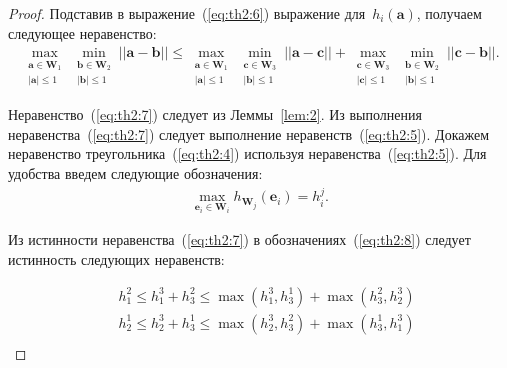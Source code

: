 \documentclass[12pt, twoside]{article}
\numberwithin{equation}{section}
\begin{document}
\begin{proof}
Подставив в выражение~(\ref{eq:th2:6}) выражение для~$h_i\left(\textbf{a}\right)$, получаем следующее неравенство:
\begin{equation}
\label{eq:th2:7}
\begin{aligned}
\max_{\substack{\textbf{a} \in \textbf{W}_1 \\ \left|\textbf{a}\right| \leq 1}} \min_{\substack{\textbf{b} \in \textbf{W}_2 \\ \left|\textbf{b}\right| \leq 1}}||\textbf{a} - \textbf{b}|| \leq 
\max_{\substack{\textbf{a} \in \textbf{W}_1 \\ \left|\textbf{a}\right| \leq 1}} \min_{\substack{\textbf{c} \in \textbf{W}_3 \\ \left|\textbf{b}\right| \leq 1}}||\textbf{a} - \textbf{c}||+
\max_{\substack{\textbf{c} \in \textbf{W}_3 \\ \left|\textbf{c}\right| \leq 1}} \min_{\substack{\textbf{b} \in \textbf{W}_2 \\ \left|\textbf{b}\right| \leq 1}}||\textbf{c} - \textbf{b}||.
\end{aligned}
\end{equation}

Неравенство~(\ref{eq:th2:7}) следует из Леммы~\ref{lem:2}. Из выполнения неравенства~(\ref{eq:th2:7}) следует выполнение неравенств~(\ref{eq:th2:5}).
Докажем неравенство треугольника~(\ref{eq:th2:4}) используя неравенства~(\ref{eq:th2:5}). Для удобства введем следующие обозначения:
\begin{equation}
\label{eq:th2:8}
\begin{aligned}
\max_{\textbf{e}_i \in \textbf{W}_i} h_{\textbf{W}_j}\left(\textbf{e}_i\right) = h_{i}^{j}.
\end{aligned}
\end{equation}

Из истинности неравенства~(\ref{eq:th2:7}) в обозначениях~(\ref{eq:th2:8}) следует истинность следующих неравенств:
 
\begin{equation}
\label{eq:th2:9}
\begin{aligned}
\quad h_{1}^{2} \leq h_{1}^{3} + h_{3}^{2} \leq \max\left(h_{1}^{3}, h_{3}^{1}\right) + \max\left(h_{3}^{2}, h_{2}^{3}\right)\\
\quad h_{2}^{1} \leq h_{2}^{3} + h_{3}^{1} \leq \max\left(h_{2}^{3}, h_{3}^{2}\right) + \max\left(h_{3}^{1}, h_{1}^{3}\right)\\
\end{aligned}
\end{equation}


\end{proof}
\end{document}
